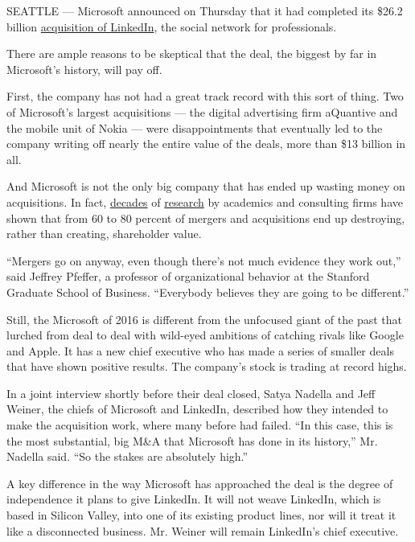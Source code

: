 SEATTLE --- Microsoft announced on Thursday that it had completed its
\$26.2 billion
\href{https://www.linkedin.com/pulse/linkedin-microsoft-our-next-play-begins-jeff-weiner?trk=prof-post}{acquisition
of LinkedIn}, the social network for professionals.

There are ample reasons to be skeptical that the deal, the biggest by
far in Microsoft's history, will pay off.

First, the company has not had a great track record with this sort of
thing. Two of Microsoft's largest acquisitions --- the digital
advertising firm aQuantive and the mobile unit of Nokia --- were
disappointments that eventually led to the company writing off nearly
the entire value of the deals, more than \$13 billion in all.

And Microsoft is not the only big company that has ended up wasting
money on acquisitions. In fact,
\href{https://hbr.org/2011/03/the-big-idea-the-new-ma-playbook}{decades}
of
\href{http://www.lek.com/press-releases/ceos-pop-question-they-need-understand-why-most-mergers-fail-and-secret-behind-those}{research}
by academics and consulting firms have shown that from 60 to 80 percent
of mergers and acquisitions end up destroying, rather than creating,
shareholder value.

``Mergers go on anyway, even though there's not much evidence they work
out,'' said Jeffrey Pfeffer, a professor of organizational behavior at
the Stanford Graduate School of Business. ``Everybody believes they are
going to be different.''

Still, the Microsoft of 2016 is different from the unfocused giant of
the past that lurched from deal to deal with wild-eyed ambitions of
catching rivals like Google and Apple. It has a new chief executive who
has made a series of smaller deals that have shown positive results. The
company's stock is trading at record highs.

In a joint interview shortly before their deal closed, Satya Nadella and
Jeff Weiner, the chiefs of Microsoft and LinkedIn, described how they
intended to make the acquisition work, where many before had failed.
``In this case, this is the most substantial, big M\&A that Microsoft
has done in its history,'' Mr. Nadella said. ``So the stakes are
absolutely high.''

A key difference in the way Microsoft has approached the deal is the
degree of independence it plans to give LinkedIn. It will not weave
LinkedIn, which is based in Silicon Valley, into one of its existing
product lines, nor will it treat it like a disconnected business. Mr.
Weiner will remain LinkedIn's chief executive.

